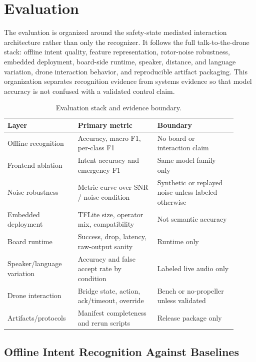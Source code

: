 \section{Evaluation}
\label{sec:evaluation}

The evaluation is organized around the safety-state mediated interaction architecture rather than only the recognizer. It follows the full talk-to-the-drone stack: offline intent quality, feature representation, rotor-noise robustness, embedded deployment, board-side runtime, speaker, distance, and language variation, drone interaction behavior, and reproducible artifact packaging. This organization separates recognition evidence from systems evidence so that model accuracy is not confused with a validated control claim.

\begin{table}[t]
    \centering
    \small
    \caption{Evaluation stack and evidence boundary.}
    \label{tab:claim_evidence}
    \begin{tabular}{@{}p{0.27\linewidth}p{0.32\linewidth}p{0.32\linewidth}@{}}
        \toprule
        Layer & Primary metric & Boundary \\
        \midrule
        Offline recognition & Accuracy, macro F1, per-class F1 & No board or interaction claim \\
        Frontend ablation & Intent accuracy and emergency F1 & Same model family only \\
        Noise robustness & Metric curve over SNR / noise condition & Synthetic or replayed noise unless labeled otherwise \\
        Embedded deployment & TFLite size, operator mix, compatibility & Not semantic accuracy \\
        Board runtime & Success, drop, latency, raw-output sanity & Runtime only \\
        Speaker/language variation & Accuracy and false accept rate by condition & Labeled live audio only \\
        Drone interaction & Bridge state, action, ack/timeout, override & Bench or no-propeller unless validated \\
        Artifacts/protocols & Manifest completeness and rerun scripts & Release package only \\
        \bottomrule
    \end{tabular}
\end{table}

\subsection{Offline Intent Recognition Against Baselines}

